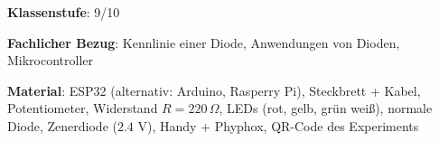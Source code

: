 \documentclass[../main.tex]{subfiles}
\begin{document}
\begin{tcolorbox}[
    width=\textwidth,
    height=\textheight,
    title=Phyphox: Kennlinien von verschiedenen Dioden,
    fonttitle=\Large,
    before title=\vspace{0.2cm}, after title=\vspace{0.2cm},
    colback=white,
    title filled=true, 
    colbacktitle=myorange,
    colframe=black,
    coltitle=black,
    ]

    \vspace{0.2cm}

    \textbf{Klassenstufe}: 9/10

    \vspace{0.5cm}

    \textbf{Fachlicher Bezug}: Kennlinie einer Diode, Anwendungen von Dioden, Mikrocontroller 

    \vspace{0.5cm}
        \textbf{Material}: ESP32 (alternativ: Arduino, Rasperry Pi), Steckbrett + Kabel, Potentiometer, Widerstand $R=220\,\Omega$, LEDs (rot, gelb, grün weiß), normale Diode, Zenerdiode ($2.4$ V), Handy + Phyphox, QR-Code des Experiments

        

\end{tcolorbox}
\end{document}
